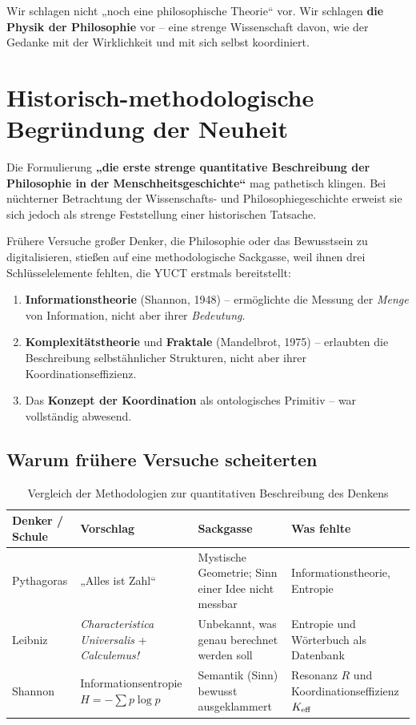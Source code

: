 \documentclass[12pt,a4paper]{article}
\begin{document}
	Wir schlagen nicht „noch eine philosophische Theorie“ vor. Wir schlagen \textbf{die Physik der Philosophie} vor – eine strenge Wissenschaft davon, wie der Gedanke mit der Wirklichkeit und mit sich selbst koordiniert.
	
	\section{Historisch-methodologische Begründung der Neuheit}
	
	Die Formulierung \textbf{„die erste strenge quantitative Beschreibung der Philosophie in der Menschheitsgeschichte“} mag pathetisch klingen. Bei nüchterner Betrachtung der Wissenschafts- und Philosophiegeschichte erweist sie sich jedoch als strenge Feststellung einer historischen Tatsache.
	
	Frühere Versuche großer Denker, die Philosophie oder das Bewusstsein zu digitalisieren, stießen auf eine methodologische Sackgasse, weil ihnen drei Schlüsselelemente fehlten, die YUCT erstmals bereitstellt:
	
	\begin{enumerate}
		\item \textbf{Informationstheorie} (Shannon, 1948) – ermöglichte die Messung der \emph{Menge} von Information, nicht aber ihrer \emph{Bedeutung}.
		\item \textbf{Komplexitätstheorie} und \textbf{Fraktale} (Mandelbrot, 1975) – erlaubten die Beschreibung selbstähnlicher Strukturen, nicht aber ihrer Koordinationseffizienz.
		\item Das \textbf{Konzept der Koordination} als ontologisches Primitiv – war vollständig abwesend.
	\end{enumerate}
	
	\subsection{Warum frühere Versuche scheiterten}
	
	\begin{table}[H]
		\centering
		\caption{Vergleich der Methodologien zur quantitativen Beschreibung des Denkens}
		\label{tab:method-comparison}
		\begin{tabular}{p{3cm}p{3.5cm}p{3.5cm}p{4cm}}
			\toprule
			\textbf{Denker / Schule} & \textbf{Vorschlag} & \textbf{Sackgasse} & \textbf{Was fehlte} \\
			\midrule
			Pythagoras & „Alles ist Zahl“ & Mystische Geometrie; Sinn einer Idee nicht messbar & Informationstheorie, Entropie \\
			Leibniz & \emph{Characteristica Universalis} + \emph{Calculemus!} & Unbekannt, was genau berechnet werden soll & Entropie und Wörterbuch als Datenbank \\
			Shannon & Informationsentropie \( H = -\sum p \log p \) & Semantik (Sinn) bewusst ausgeklammert & Resonanz \(R\) und Koordinationseffizienz \(\Keff\) \\
			\bottomrule
		\end{tabular}
	\end{table}
	
\end{document}
